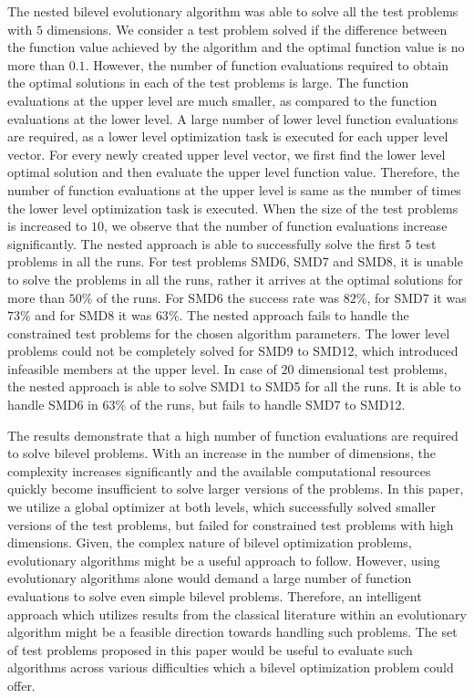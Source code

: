 \documentclass[twoside]{article}
\begin{document}
The nested bilevel evolutionary algorithm was able to solve all the test problems with $5$ dimensions. We consider a test problem solved if the difference between the function value achieved by the algorithm and the optimal function value is no more than $0.1$. However, the number of function evaluations required to obtain the optimal solutions in each of the test problems is large. The function evaluations at the upper level are much smaller, as compared to the function evaluations at the lower level. A large number of lower level function evaluations are required, as a lower level optimization task is executed for each upper level vector. For every newly created upper level vector, we first find the lower level optimal solution and then evaluate the upper level function value. Therefore, the number of function evaluations at the upper level is same as the number of times the lower level optimization task is executed.
When the size of the test problems is increased to $10$, we observe that the number of function evaluations increase significantly. The nested approach is able to successfully solve the first 5 test problems in all the runs. For test problems SMD6, SMD7 and SMD8, it is unable to solve the problems in all the runs, rather it arrives at the optimal solutions for more than $50\%$ of the runs. For SMD6 the success rate was $82\%$, for SMD7 it was $73\%$ and for SMD8 it was $63\%$. The nested approach fails to handle the constrained test problems for the chosen algorithm parameters. The lower level problems could not be completely solved for SMD9 to SMD12, which introduced infeasible members at the upper level. In case of $20$ dimensional test problems, the nested approach is able to solve SMD1 to SMD5 for all the runs. It is able to handle SMD6 in $63\%$ of the runs, but fails to handle SMD7 to SMD12.

The results demonstrate that a high number of function evaluations are required to solve bilevel problems. With an increase in the number of dimensions, the complexity increases significantly and the available computational resources quickly become insufficient to solve larger versions of the problems. In this paper, we utilize a global optimizer at both levels, which successfully solved smaller versions of the test problems, but failed for constrained test problems with high dimensions. Given, the complex nature of bilevel optimization problems, evolutionary algorithms might be a useful approach to follow. However, using evolutionary algorithms alone would demand a large number of function evaluations to solve even simple bilevel problems. Therefore, an intelligent approach which utilizes results from the classical literature within an evolutionary algorithm might be a feasible direction towards handling such problems. The set of test problems proposed in this paper would be useful to evaluate such algorithms across various difficulties which a bilevel optimization problem could offer.
\end{document}
